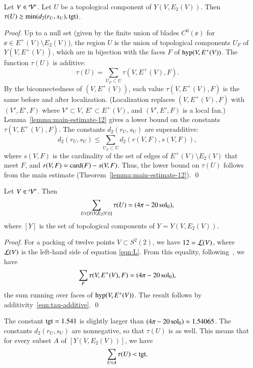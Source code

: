 \documentclass{llncs}
\def\op#1{{\hbox{#1}}}
\begin{document}
\begin{lemma}\label{lemma:tauU'}
  Let $V\in {\mathcal V}'$.
Let $U$ be a topological component of
  $Y(V,E_2(V))$.   Then $\tau(U)\ge \min(d_2(r_U,s_U),\op{tgt})$.
\end{lemma}

\begin{proof}
Up to a null set (given by the finite union of blades $C^0(\ee)$ for
$\ee\in E^+(V)\setminus E_2(V)$), the region $U$ is the union of topological
components $U_F$ of $Y(V,E^+(V))$, which are in bijection with the faces
$F$ of $\op{hyp}(V,E^+(V))$.  The function $\tau(U)$ is additive:
\begin{equation}\label{eqn:tau-additive}
\tau(U) = \sum_{U_F\subset U} \tau(V,E^+(V),F).
\end{equation}
By the biconnectedness of $(V,E^+(V))$, each value $\tau(V,E^+(V),F)$ is the
same before and after localization.  (Localization replaces $(V,E^+(V),F)$ with $(V',E',F)$
where $V'\subset V$, $E'\subset E^+(V)$, and $(V',E',F)$ is a local fan.)
Lemma~\ref{lemma:main-estimate-12} gives a lower bound on the
constants $\tau(V,E^+(V),F)$.  The constants $d_2(r_U,s_U)$ are superadditive:
\[
d_2(r_U,s_U) \le \sum_{U_F\subset U} d_2(r(V,F),s(V,F)),
\]
where $s(V,F)$ is the cardinality of the set of edges of $E^+(V)\setminus
E_2(V)$ that meet $F$, and $r(V,F) = \card(F)-s(V,F)$.  Thus, the 
lower bound on $\tau(U)$ follows from the main estimate
(Theorem~\ref{lemma:main-estimate-12}).
\qed\end{proof}

\begin{lemma}\label{lemma:uce} 
Let $V\in {\mathcal V}'$.  Then
\[
\sum_{U\in [Y(V,E_2(V))]} \tau(U) = (4\pi - 20\operatorname{sol}_0),
\]
where $[Y]$ is the set of topological components of $Y=Y(V,E_2(V))$.
\end{lemma}

%
\begin{proof} For a packing of twelve points $V\subset S^2(2)$, we have
$12={\mathcal L}(V)$, where ${\mathcal L}(V)$ is the left-hand side of equation \eqref{eqn:L}.   
From this equality, following~\cite[8.2.3]{DSP}, we have
\[
  \sum_F \tau (V,E^+(V),F) = (4\pi - 20\operatorname{sol}_0),
\]
the sum running over faces of $\op{hyp}(V,E^+(V))$.
The result follows by additivity~\eqref{eqn:tau-additive}.
\qed\end{proof}

The constant $\op{tgt}=1.541$ is slightly
larger than $(4\pi-20\operatorname{sol}_0)\approx 1.54065$.  The constants $d_2(r_U,s_U)$ are nonnegative, so that
$\tau(U)$ is as well.  This means that for every subset
$A$ of $[Y(V,E_2(V))]$, we have
\begin{equation}\label{eqn:subtgt}
\sum_{U\in A} \tau(U) < \op{tgt}.
\end{equation}
\end{document}
